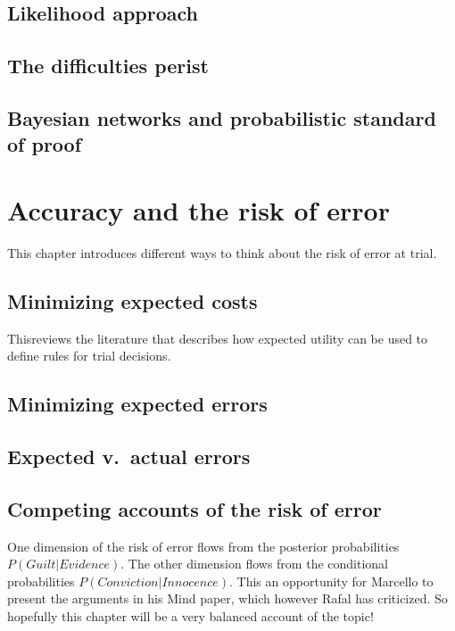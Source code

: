 \documentclass[]{book}
\begin{document}
\section{Likelihood approach}

\section{The difficulties perist}

\section{Bayesian networks and probabilistic standard of proof}

\chapter{Accuracy and the risk of error}

This chapter introduces different ways to think about the risk of error
at trial.

\section{Minimizing expected costs}

Thisreviews the literature that describes how expected utility can be
used to define rules for trial decisions.

\section{Minimizing expected errors}

\section{Expected v.\ actual errors}

\section{Competing accounts 
of the risk of error}

One dimension of the risk of error flows from the posterior
probabilities \(P(Guilt | Evidence)\). The other dimension flows from
the conditional probabilities \(P(Conviction | Innocence)\). This an
opportunity for Marcello to present the arguments in his Mind paper,
which however Rafal has criticized. So hopefully this chapter will be a
very balanced account of the topic!
\end{document}

